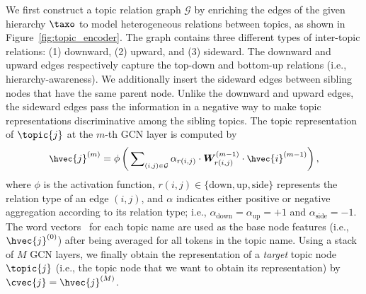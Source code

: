 We first construct a topic relation graph $\mathcal{G}$ by enriching the edges of the given hierarchy $\taxo$ to model heterogeneous relations between topics, as shown in Figure~\ref{fig:topic_encoder}.
The graph contains three different types of inter-topic relations:
(1) downward, (2) upward, and (3) sideward.
The downward and upward edges respectively capture the top-down and bottom-up relations (i.e., hierarchy-awareness).
We additionally insert the sideward edges between sibling nodes that have the same parent node.
Unlike the downward and upward edges, the sideward edges pass the information in a negative way to make topic representations discriminative among the sibling topics.
The topic representation of $\topic{j}$ at the $m$-th GCN layer is computed by
\begin{equation}
\small
    \hvec{j}^{(m)}= \phi\left(
    \sideset{}{_{(i, j)\in\mathcal{G}}}\sum \alpha_{r(i, j)} \cdot \bm{W}^{(m-1)}_{r(i, j)} \cdot \hvec{i}^{(m-1)}\right),
\end{equation}
where $\phi$ is the activation function, $r(i, j)\in\{\text{down}, \text{up}, \text{side}\}$ represents the relation type of an edge $(i,j)$, and $\alpha$ indicates either positive or negative aggregation according to its relation type; 
i.e., $\alpha_{\text{down}}=\alpha_{\text{up}}=+1$ and $\alpha_{\text{side}}=-1$.
The \glove word vectors~\cite{pennington2014glove} for each topic name are used as the base node features (i.e., $\hvec{j}^{(0)}$) after being averaged for all tokens in the topic name.
Using a stack of $M$ GCN layers, we finally obtain the representation of a \textit{target} topic node $\topic{j}$ (i.e., the topic node that we want to obtain its representation) by $\cvec{j}=\hvec{j}^{(M)}$.

